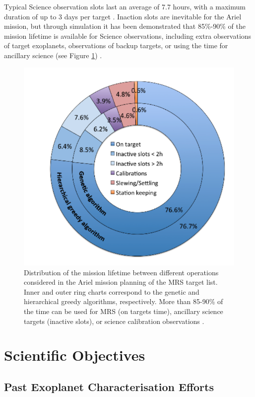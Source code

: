 \documentclass[12pt]{article}
\begin{document}
Typical Science observation slots last an average of 7.7 hours, with a maximum duration of up to 3 days per target \cite{salvignol2024ariel}.
Inaction slots are inevitable for the Ariel mission, but through simulation it has been demonstrated that 85\%-90\% of the mission lifetime is available for Science observations, including extra observations of target exoplanets, observations of backup targets,
or using the time for ancillary science (see Figure \ref{fig:8}) \cite{arielstudyreport}.

\begin{figure}
    \centering
    \includegraphics[width=.5\textwidth]{distribution ariel.png}
    \caption{Distribution of the mission lifetime between different operations considered in the Ariel mission planning of the MRS target list. Inner and outer ring charts correspond to the genetic and hierarchical greedy algorithms, respectively. More than
    85-90\% of the time can be used for MRS (on targets time), ancillary science targets (inactive slots), or science calibration observations \protect\cite{arielstudyreport}.}
    \label{fig:8}
\end{figure}

\newpage

\section{Scientific Objectives}

\subsection{Past Exoplanet Characterisation Efforts}
\end{document}
